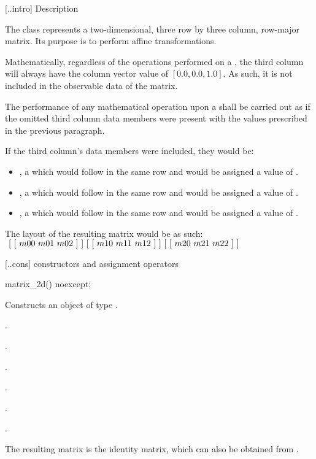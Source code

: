  [\iotwod.\matrixtwod.intro] { Description}

\pnum
{}
The  class represents a two-dimensional, three row by three column, row-major matrix. Its purpose is to perform affine transformations.

\pnum
Mathematically, regardless of the operations performed on a , the third column will always have the column vector value of $[0.0, 0.0, 1.0]$. As such, it is not included in the observable data of the matrix.

\pnum
The performance of any mathematical operation upon a  shall be carried out as if the omitted third column data members were present with the values prescribed in the previous paragraph.

\pnum
\enternote
If the third column's data members were included, they would be:

\begin{itemize}
	\item {}, a  which would follow  in the same row and would be assigned a value of .
	
	\item {}, a  which would follow  in the same row and would be assigned a value of .
	
	\item {}, a  which would follow  in the same row and would be assigned a value of .
\end{itemize}

\pnum
The layout of the resulting matrix would be as such: \\
$
~[~[~m00~m01~m02~]~] \\
~[~[~m10~m11~m12~]~] \\
~[~[~m20~m21~m22~]~]$
\exitnote

 [\iotwod.\matrixtwod.cons] { constructors and assignment operators}

\begin{itemdecl}
	matrix_2d() noexcept;
\end{itemdecl}
\begin{itemdescr}
	\pnum
	\effects
	Constructs an object of type .
	
	\pnum
	\postconditions
	.
	
	\pnum
	.
	
	\pnum
	.
	
	\pnum
	.
	
	\pnum
	.
	
	\pnum
	.
	
	\pnum
	\realnote
	The resulting matrix is the identity matrix, which can also be obtained from .

\end{itemdescr}

